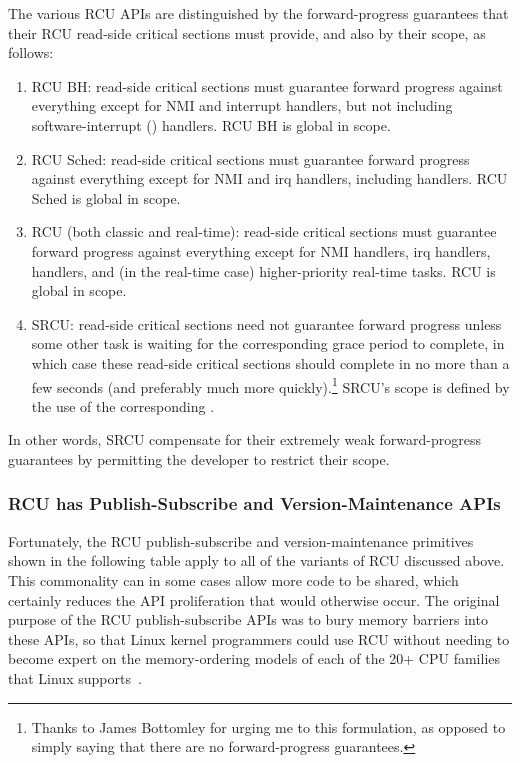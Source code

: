 The various RCU APIs are distinguished by the forward-progress
guarantees that their RCU read-side critical sections must provide,
and also by their scope, as follows:

\begin{enumerate}
\item	RCU BH: read-side critical sections
	must guarantee forward progress against everything except for
	NMI and interrupt handlers, but not including software-interrupt
	() handlers.
	RCU BH is global in scope.
\item	RCU Sched: read-side critical sections must guarantee forward
	progress against everything except for NMI and irq handlers,
	including  handlers.
	RCU Sched is global in scope.
\item	RCU (both classic and real-time): read-side critical sections
	must guarantee forward progress against everything except for
	NMI handlers, irq handlers,  handlers, and (in the
	real-time case) higher-priority real-time tasks.
	RCU is global in scope.
\item	SRCU: read-side critical sections need not guarantee
	forward progress unless some other task is waiting for the
	corresponding grace period to complete, in which case these
	read-side critical sections should complete in no more than
	a few seconds (and preferably much more quickly).\footnote{
		Thanks to James Bottomley for urging me to this
		formulation, as opposed to simply saying that
		there are no forward-progress guarantees.}
	SRCU's scope is defined by the use of the corresponding
	.
\end{enumerate}

In other words, SRCU compensate for their extremely weak
forward-progress guarantees by permitting the developer to restrict
their scope.

\subsubsection{RCU has Publish-Subscribe and Version-Maintenance APIs}
\label{sec:defer:RCU has Publish-Subscribe and Version-Maintenance APIs}

Fortunately, the RCU publish-subscribe and version-maintenance
primitives shown in the following
table apply to all of the variants of RCU discussed above.
This commonality can in some cases allow more code to be shared,
which certainly reduces the API proliferation that would otherwise
occur.
The original purpose of the RCU publish-subscribe APIs was to
bury memory barriers into these APIs, so that Linux kernel
programmers could use RCU without needing to become expert on
the memory-ordering models of each of the 20+ CPU families
that Linux supports~\cite{Spraul01}.

